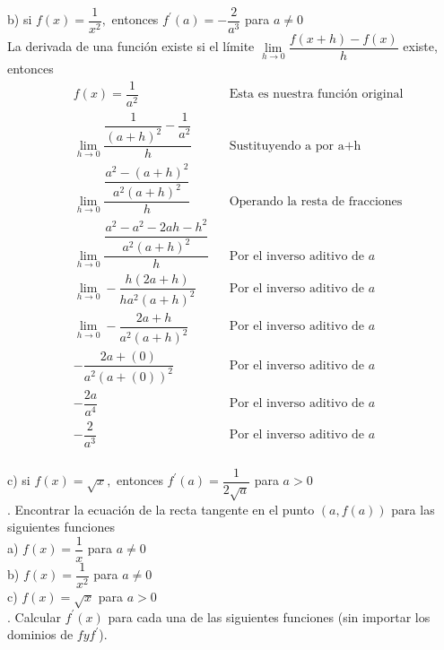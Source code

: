 \documentclass[letterpaper]{article}
\newcommand{\fp}[1]{#1^{\prime}}
\begin{document}
b) si $ f(x) = \dfrac{1}{x^2}, $ entonces $ \fp{f}(a) = - \dfrac{2}{a^{3}}$ para $ a \neq 0 $\\

La derivada de una función existe si el límite $ \lim\limits_{h \to 0} \dfrac{f(x+h)-f(x)}{h} $ existe, entonces 
\begin{align*}
	& f(x) = \dfrac{1}{a^{2}} &&\text{Esta es nuestra función original}\\
	&\lim\limits_{h \to 0} \dfrac{\dfrac{1}{(a+h)^{2}}-\dfrac{1}{a^{2}}}{h} &&\text{Sustituyendo a por a+h}\\
	&\lim\limits_{h \to 0} \dfrac{\dfrac{a^{2}-(a+h)^{2}}{a^{2}(a+h)^{2}}}{h} &&\text{Operando la resta de fracciones}\\
	&\lim\limits_{h \to 0} \dfrac{\dfrac{a^{2}-a^{2}-2ah-h^{2}}{a^{2}(a+h)^{2}}}{h} &&\text{Por el inverso aditivo de }a\\
	&\lim\limits_{h \to 0} -\dfrac{h(2a+h)}{ha^{2}(a+h)^{2}} &&\text{Por el inverso aditivo de }a\\
	&\lim\limits_{h \to 0} -\dfrac{2a+h}{a^{2}(a+h)^{2}} &&\text{Por el inverso aditivo de }a\\
	&-\dfrac{2a+(0)}{a^{2}(a+(0))^{2}} &&\text{Por el inverso aditivo de }a\\
	&-\dfrac{2a}{a^{4}} &&\text{Por el inverso aditivo de }a\\
	&-\dfrac{2}{a^{3}} &&\text{Por el inverso aditivo de }a\\
\end{align*}


c) si $ f(x) = \sqrt{x}, $ entonces $ \fp{f}(a) =  \dfrac{1}{2\sqrt{a}}$ para $ a > 0 $\\


. Encontrar la ecuación de la recta tangente en el punto $ (a, f (a)) $ para las siguientes funciones\\

a) $ f(x) = \dfrac{1}{x} $ para $ a\neq 0 $\\


b) $ f(x) = \dfrac{1}{x^{2}} $ para $ a\neq 0 $\\


c) $ f(x) = \sqrt{x} $ para $ a > 0 $\\


. Calcular $ \fp{f}(x) $ para cada una de las siguientes funciones (sin importar los dominios de $ f y \fp{f} $).\\
\end{document}
